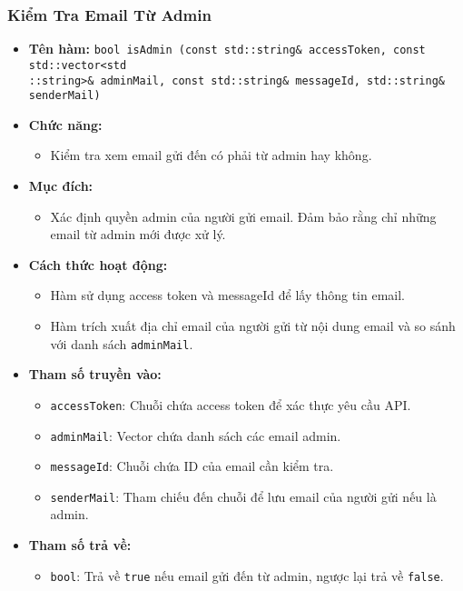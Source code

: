 \subsubsection{Kiểm Tra Email Từ Admin}
\begin{itemize}
    \item \textbf{Tên hàm:} 
    \texttt{bool isAdmin (const std::string\& accessToken, const std::vector<std\\::string>\& adminMail, const std::string\& messageId, std::string\& senderMail)}
    \item \textbf{Chức năng:} 
    \begin{itemize}
        \item Kiểm tra xem email gửi đến có phải từ admin hay không.
    \end{itemize}
    \item \textbf{Mục đích:} 
    \begin{itemize}
        \item Xác định quyền admin của người gửi email. Đảm bảo rằng chỉ những email từ admin mới được xử lý.
    \end{itemize}
    \item \textbf{Cách thức hoạt động:} 
    \begin{itemize}
        \item Hàm sử dụng access token và messageId để lấy thông tin email.
        \item Hàm trích xuất địa chỉ email của người gửi từ nội dung email và so sánh với danh sách \texttt{adminMail}.
    \end{itemize}
    \item \textbf{Tham số truyền vào:} 
    \begin{itemize}
        \item \texttt{accessToken}: Chuỗi chứa access token để xác thực yêu cầu API.
        \item \texttt{adminMail}: Vector chứa danh sách các email admin.
        \item \texttt{messageId}: Chuỗi chứa ID của email cần kiểm tra.
        \item \texttt{senderMail}: Tham chiếu đến chuỗi để lưu email của người gửi nếu là admin.
    \end{itemize}
    \item \textbf{Tham số trả về:} 
    \begin{itemize}
        \item \texttt{bool}: Trả về \texttt{true} nếu email gửi đến từ admin, ngược lại trả về \texttt{false}.
    \end{itemize}
\end{itemize}

